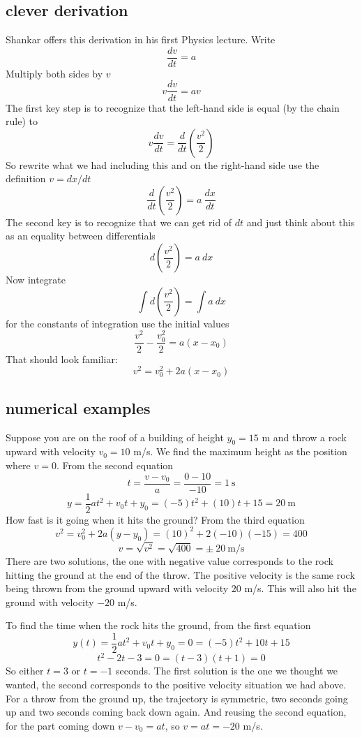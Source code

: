 \documentclass[11pt, oneside]{article}   	%
\begin{document}
\subsection*{clever derivation}
Shankar offers this derivation in his first Physics lecture.  Write
\[ \frac{dv}{dt} = a \]
Multiply both sides by $v$
\[ v \frac{dv}{dt} = av \]
The first key step is to recognize that the left-hand side is equal (by the chain rule) to 
\[ v \frac{dv}{dt} = \frac{d}{dt} (\frac{v^2}{2}) \]
So rewrite what we had including this and on the right-hand side use the definition $v = dx/dt$
\[ \frac{d}{dt} (\frac{v^2}{2}) = a \ \frac{dx}{dt} \]
The second key is to recognize that we can get rid of $dt$ and just think about this as an equality between differentials
\[ d(\frac{v^2}{2}) = a \ dx \]
Now integrate
\[ \int d(\frac{v^2}{2}) = \int a \ dx \]
for the constants of integration use the initial values
\[ \frac{v^2}{2} - \frac{v_0^2}{2} = a (x - x_0) \]
That should look familiar:
\[ v^2 = v_0^2 + 2a (x - x_0) \]

\subsection*{numerical examples}
Suppose you are on the roof of a building of height $y_0=15$ m and throw a rock upward with velocity $v_0=10$ m/s.  We find the maximum height as the position where $v=0$.  From the second equation
\[ t = \frac{v-v_0}{a} = \frac{0 - 10}{-10} = 1 \ \text{s} \]
\[ y = \frac{1}{2}at^2 + v_0t + y_0 =  (-5) t^2 + (10) t + 15 = 20 \ \text{m} \]
How fast is it going when it hits the ground?  From the third equation
\[ v^2 = v_0^2 + 2a(y - y_0) = (10)^2 + 2(-10)(-15) = 400 \]
\[ v = \sqrt{v^2} = \sqrt{400} = \pm \ 20 \ \text{m/s} \]
There are two solutions, the one with negative value corresponds to the rock hitting the ground at the end of the throw.  The positive velocity is the same rock being thrown from the ground upward with velocity $20$ m/s.  This will also hit the ground with velocity $-20$ m/s.  

To find the time when the rock hits the ground, from the first equation
\[ y(t) = \frac{1}{2}at^2 + v_0t + y_0 = 0 = (-5)t^2 + 10t + 15 \]
\[ t^2 - 2t - 3 = 0 = (t-3)(t+1) = 0 \]
So either $t = 3$ or $t = -1$ seconds.  The first solution is the one we thought we wanted, the second corresponds to the positive velocity situation we had above.  For a throw from the ground up, the trajectory is symmetric, two seconds going up and two seconds coming back down again.  And reusing the second equation, for the part coming down $v - v_0 = at$, so  $v = at = -20$ m/s.
\end{document}

